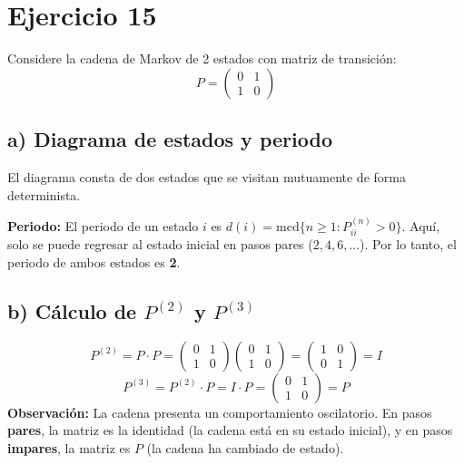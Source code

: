 \documentclass[letterpaper, 12pt]{article}
\begin{document}
    \newpage

    \section*{Ejercicio 15}
    Considere la cadena de Markov de 2 estados con matriz de transición:
    \[
    P = \begin{pmatrix} 
    0 & 1 \\ 
    1 & 0 
    \end{pmatrix}
    \]

    \subsection*{a) Diagrama de estados y periodo}
    El diagrama consta de dos estados que se visitan mutuamente de forma determinista.
    \begin{center}
    \end{center}

    \textbf{Periodo:} El periodo de un estado $i$ es $d(i) = \text{mcd}\{n \geq 1 : P_{ii}^{(n)} > 0\}$. Aquí, solo se puede regresar al estado inicial en pasos pares ($2, 4, 6, \dots$). Por lo tanto, el periodo de ambos estados es \textbf{2}.

    \subsection*{b) Cálculo de $P^{(2)}$ y $P^{(3)}$}
    \[
    P^{(2)} = P \cdot P = \begin{pmatrix} 0 & 1 \\ 1 & 0 \end{pmatrix} \begin{pmatrix} 0 & 1 \\ 1 & 0 \end{pmatrix} = \begin{pmatrix} 1 & 0 \\ 0 & 1 \end{pmatrix} = I
    \]
    \[
    P^{(3)} = P^{(2)} \cdot P = I \cdot P = \begin{pmatrix} 0 & 1 \\ 1 & 0 \end{pmatrix} = P
    \]
    \textbf{Observación:} La cadena presenta un comportamiento oscilatorio. En pasos \textbf{pares}, la matriz es la identidad (la cadena está en su estado inicial), y en pasos \textbf{impares}, la matriz es $P$ (la cadena ha cambiado de estado).
\end{document}
